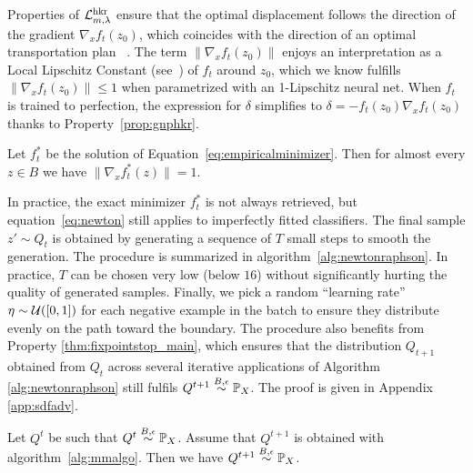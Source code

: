 Properties of $\mathcal{L}^{\text{hkr}}_{m,\lambda}$ ensure that the optimal displacement follows the direction of the gradient $\nabla_x f_t(z_0)$, which coincides with the direction of an optimal transportation plan ~\cite{serrurier2021achieving}. The term $\|\nabla_x f_t(z_0)\|$ enjoys an interpretation as a Local Lipschitz Constant (see~\cite{jordan2020exactly}) of $f_t$ around $z_0$, which we know fulfills $\|\nabla_x f_t(z_0)\|\leq 1$ when parametrized with an 1-Lipschitz neural net. When $f_t$ is trained to perfection, the expression for $\delta$ simplifies to $\delta=-f_t(z_0)\nabla_x f_t(z_0)$ thanks to Property~\ref{prop:gnphkr}.  

\begin{property}\label{prop:gnphkr}
Let $f^{*}_t$ be the solution of Equation~\ref{eq:empiricalminimizer}. Then for almost every $z\in B$ we have $\|\nabla_x f^*_t(z)\|=1$.  
\end{property}

In practice, the exact minimizer $f^{*}_t$ is not always retrieved, but equation~\ref{eq:newton} still applies to imperfectly fitted classifiers. The final sample $z'\sim Q_t$ is obtained by generating a sequence of $T$ small steps to smooth the generation. The procedure is summarized in algorithm~\ref{alg:newtonraphson}. In practice, $T$ can be chosen very low (below $16$) without significantly hurting the quality of generated samples. Finally, we pick a random ``learning rate'' $\eta\sim\mathcal{U}([0,1])$ for each negative example in the batch to ensure they distribute evenly on the path toward the boundary. The procedure also benefits from Property \ref{thm:fixpointstop_main}, which ensures that the distribution $Q_{t+1}$ obtained from $Q_t$ across several iterative applications of Algorithm \ref{alg:newtonraphson} still fulfils $Q^{t+1}\stackrel{B,\epsilon}{\sim}\mathbb{P}_X$. The proof is given in Appendix \ref{app:sdfadv}.

\begin{property}\label{thm:fixpointstop_main}
Let $Q^{t}$ be such that $Q^{t}\stackrel{B,\epsilon}{\sim}\mathbb{P}_X$. Assume that $Q^{t+1}$ is obtained with algorithm~\ref{alg:mmalgo}. Then we have $Q^{t+1}\stackrel{B,\epsilon}{\sim}\mathbb{P}_X$. 
\end{property}




